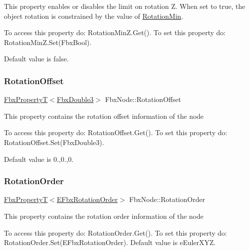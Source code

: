 This property enables or disables the limit on rotation Z. When set to {\ttfamily true}, the object rotation is constrained by the value of \hyperlink{class_fbx_node_a186dc96c347a68ff32eb1641f02c70c8}{Rotation\+Min}.

To access this property do\+: Rotation\+Min\+Z.\+Get(). To set this property do\+: Rotation\+Min\+Z.\+Set(\+Fbx\+Bool).

Default value is false. \mbox{\label{class_fbx_node_a2e5e9ab154369d18c2495b52990436ea}} 
\subsubsection{\texorpdfstring{Rotation\+Offset}{RotationOffset}}
{\footnotesize\ttfamily \hyperlink{class_fbx_property_t}{Fbx\+PropertyT}$<$\hyperlink{fbxtypes_8h_ae0a96f14cde566774c7553aa7523b7a7}{Fbx\+Double3}$>$ Fbx\+Node\+::\+Rotation\+Offset}

This property contains the rotation offset information of the node

To access this property do\+: Rotation\+Offset.\+Get(). To set this property do\+: Rotation\+Offset.\+Set(\+Fbx\+Double3).

Default value is 0.,0.,0. \mbox{\label{class_fbx_node_ac985c192cf9439c2618de0de4ef46ab1}} 
\subsubsection{\texorpdfstring{Rotation\+Order}{RotationOrder}}
{\footnotesize\ttfamily \hyperlink{class_fbx_property_t}{Fbx\+PropertyT}$<$\hyperlink{fbxmath_8h_ae46778666b56bb0abe5992b855fe9332}{E\+Fbx\+Rotation\+Order}$>$ Fbx\+Node\+::\+Rotation\+Order}

This property contains the rotation order information of the node

To access this property do\+: Rotation\+Order.\+Get(). To set this property do\+: Rotation\+Order.\+Set(\+E\+Fbx\+Rotation\+Order). Default value is e\+Euler\+X\+YZ. \mbox{\label{class_fbx_node_ad9175d66436673534fda8fa58d457e01}} 

